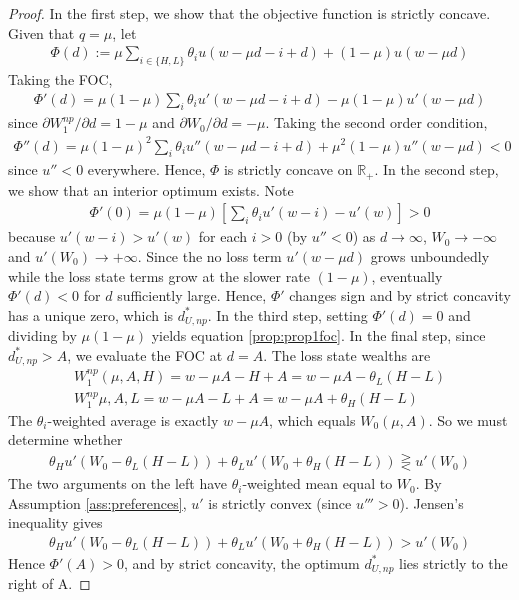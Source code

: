 \documentclass[natbib=false,preprint,12pt]{elsarticle}
\theoremstyle{plain}
\theoremstyle{definition}
\theoremstyle{plain}
\theoremstyle{TheoremNum}
\theoremstyle{CorollaryNum}
\theoremstyle{PropositionNum}
\theoremstyle{TheoremNum}
\begin{document}
\begin{proof}
    In the first step, we show that the objective function is strictly concave. Given that $q=\mu$, let
    \begin{align*}
        \Phi(d):= \mu \sum_{i \in \{H,L\}} \theta_i u(w-\mu d -i + d) + (1-\mu) u (w-\mu d)
    \end{align*}
    Taking the FOC,
    \begin{align*}
        \Phi'(d) = \mu (1-\mu) \sum_i \theta_i u'(w-\mu d - i + d) - \mu (1-\mu)u'(w-\mu d)
    \end{align*}
    since $\partial W_1^{np}/\partial d = 1-\mu$ and $\partial W_0/\partial d = -\mu$. Taking the second order condition,
    \begin{align*}
        \Phi''(d)=\mu(1-\mu)^2 \sum_i \theta_i u''(w-\mu d -i + d) + \mu^2(1-\mu)u''(w-\mu d)<0
    \end{align*}
    since $u''<0$ everywhere. Hence, $\Phi$ is strictly concave on $\mathbb{R}_+$.
    In the second step, we show that an interior optimum exists. Note
    \begin{align*}
        \Phi'(0)= \mu(1-\mu)\left[\sum_i \theta_i u'(w-i)-u'(w)\right]>0
    \end{align*}
    because $u'(w-i)>u'(w)$ for each $i>0$ (by $u''<0$) as $d \rightarrow \infty$, $W_0 \rightarrow -\infty$ and $u'(W_0)\rightarrow +\infty$. Since the no loss term $u'(w-\mu d)$ grows unboundedly while the loss state terms grow at the slower rate $(1-\mu)$, eventually $\Phi'(d)<0$ for $d$ sufficiently large. Hence, $\Phi'$ changes sign and by strict concavity has a unique zero, which is $d_{U,np}^*$.
    In the third step, setting $\Phi'(d)=0$ and dividing by $\mu (1-\mu)$ yields equation \ref{prop:prop1foc}.
    In the final step, since $d_{U,np}^*>A$, we evaluate the FOC at $d=A$. The loss state wealths are 
    \begin{align*}
        W_{1}^{np}(\mu,A,H) = w-\mu A - H+A=w-\mu A -\theta_L (H-L) \\
        W_1^{np}{\mu,A,L} = w- \mu A - L + A = w -\mu A + \theta_H(H-L)
    \end{align*}
    The $\theta_i$-weighted average is exactly $w-\mu A$, which equals $W_0 (\mu,A)$.
    So we must determine whether
    \begin{align*}
        \theta_H u'(W_0 - \theta_L(H-L))+\theta_L u'(W_0 + \theta_H(H-L)) \gtreqless u'(W_0)
    \end{align*}
    The two arguments on the left have $\theta_i$-weighted mean equal to $W_0$. By Assumption \ref{ass:preferences}, $u'$ is strictly convex (since $u'''>0$). Jensen's inequality gives
    \begin{align*}
        \theta_H u'(W_0 - \theta_L (H-L)) + \theta_L u'(W_0 + \theta_H(H-L)) > u'(W_0)
    \end{align*}
    Hence $\Phi'(A)>0$, and by strict concavity, the optimum $d_{U,np}^*$ lies strictly to the right of A.
\end{proof}
\end{document}
